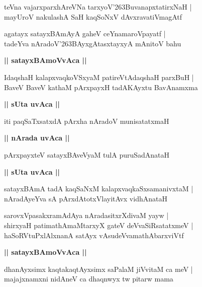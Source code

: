 \documentclass[twoside,12pt,openright]{book}
\def\S{\char'263}
\newcounter{shloka}[chapter]
\def\uvaca#1{\centerline{{\large\textbf{#1}}}}
\begin{document}
\begin{shloka}%
teVna vajarxparxhAreVNa tarxyoV\S BuvanapxtatirxNaH |\\
mayUroV nakulashA SaH kaqSoNxV dAvxravatiVmagAtf 
\end{shloka}

\begin{shloka}%
agatayx satayxBAmAyA gaheV ceYnamaroVpayatf |\\
tadeYva nAradoV\S BAyxgAtasxtayxyA mAnitoV bahu 
\end{shloka}

\uvaca{|| satayxBAmoVvAca ||}

\begin{shloka}%
IdaqshaH kalapxvaqkoVSxyaM patireVtAdaqshaH parxBuH |\\
BaveV BaveV kathaM pArxpayxH tadAKAyxtu BavAnamxma 
\end{shloka}

\uvaca{|| sUta uvAca ||}

\begin{shloka}%
iti paqSaTxsatxdA pArxha nAradoV munisatatxmaH 
\end{shloka}

\uvaca{|| nArada uvAca ||}

\begin{shloka}%
pArxpayxteV satayxBAveVyaM tulA puruSadAnataH 
\end{shloka}

\uvaca{|| sUta uvAca ||}

\begin{shloka}%
satayxBAmA tadA kaqSaNxM kalapxvaqkaSxsamanivxtaM |\\
nAradAyeYva sA pArxdAtotxVlayitAvx vidhAnataH
\end{shloka}

\begin{shloka}%
sarovxVpasakxramAdAya nAradasitxrXdivaM yayw |\\
shirxyaH patimathAmaMtarxyX gateV deVvaSiRsatatxmeV |\\
haSoRVtuPxlAlxnanA satAyx vAsudeVvamathAbarxviVtf
\end{shloka}

\uvaca{|| satayxBAmoVvAca ||}

\begin{shloka}%
dhanAyxsimx kaqtakaqtAyxsimx saPalaM jiVvitaM ca meV |\\
majajxnamxni nidAneV ca dhaqnwyx tw pitarw mama
\end{shloka}
\end{document}
